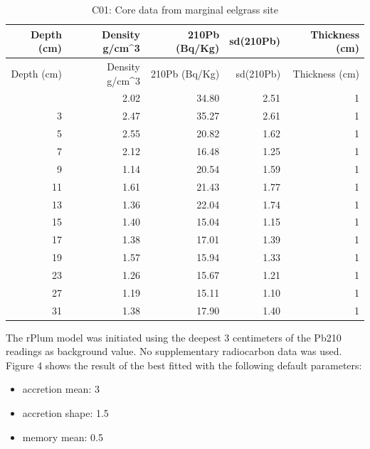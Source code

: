 \documentclass[
  12pt,
]{article}
\providecommand{\tightlist}{%
  \setlength{\itemsep}{0pt}\setlength{\parskip}{0pt}}
\begin{document}
\begin{longtable}[]{@{}rrrrr@{}}
\caption{C01: Core data from marginal eelgrass site}\tabularnewline
\toprule\noalign{}
Depth (cm) & Density g/cm\^{}3 & 210Pb (Bq/Kg) & sd(210Pb) & Thickness
(cm) \\
\midrule\noalign{}
\endfirsthead
\toprule\noalign{}
Depth (cm) & Density g/cm\^{}3 & 210Pb (Bq/Kg) & sd(210Pb) & Thickness
(cm) \\
\midrule\noalign{}
\endhead
\bottomrule\noalign{}
\endlastfoot
1 & 2.02 & 34.80 & 2.51 & 1 \\
3 & 2.47 & 35.27 & 2.61 & 1 \\
5 & 2.55 & 20.82 & 1.62 & 1 \\
7 & 2.12 & 16.48 & 1.25 & 1 \\
9 & 1.14 & 20.54 & 1.59 & 1 \\
11 & 1.61 & 21.43 & 1.77 & 1 \\
13 & 1.36 & 22.04 & 1.74 & 1 \\
15 & 1.40 & 15.04 & 1.15 & 1 \\
17 & 1.38 & 17.01 & 1.39 & 1 \\
19 & 1.57 & 15.94 & 1.33 & 1 \\
23 & 1.26 & 15.67 & 1.21 & 1 \\
27 & 1.19 & 15.11 & 1.10 & 1 \\
31 & 1.38 & 17.90 & 1.40 & 1 \\
\end{longtable}

The rPlum model was initiated using the deepest 3 centimeters of the
Pb210 readings as background value. No supplementary radiocarbon data
was used. Figure 4 shows the result of the best fitted with the
following default parameters:

\begin{itemize}
\tightlist
\item
  accretion mean: 3
\item
  accretion shape: 1.5
\item
  memory mean: 0.5
\end{itemize}
\end{document}

